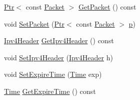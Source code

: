 \begin{DoxyCompactItemize}
\hyperlink{classns3_1_1Ptr}{Ptr}$<$ const \hyperlink{classns3_1_1Packet}{Packet} $>$ \hyperlink{classns3_1_1aodv_1_1QueueEntry_a2c36e5c3017c7fba3c695e08fd681497}{Get\+Packet} () const 
\item 
void \hyperlink{classns3_1_1aodv_1_1QueueEntry_a8fa8ea1be9c2eeb6edecc478ed0d5e32}{Set\+Packet} (\hyperlink{classns3_1_1Ptr}{Ptr}$<$ const \hyperlink{classns3_1_1Packet}{Packet} $>$ \hyperlink{lte__link__budget__x2__handover__measures_8m_ac9de518908a968428863f829398a4e62}{p})
\item 
\hyperlink{classns3_1_1Ipv4Header}{Ipv4\+Header} \hyperlink{classns3_1_1aodv_1_1QueueEntry_a0ec60aa6b1d7c7835bafc664da7efb12}{Get\+Ipv4\+Header} () const 
\item 
void \hyperlink{classns3_1_1aodv_1_1QueueEntry_afee33142d326a5d62388cb6bc47a1941}{Set\+Ipv4\+Header} (\hyperlink{classns3_1_1Ipv4Header}{Ipv4\+Header} h)
\item 
void \hyperlink{classns3_1_1aodv_1_1QueueEntry_aa1837744c201bb1c76532ac6b8c916e8}{Set\+Expire\+Time} (\hyperlink{classns3_1_1Time}{Time} exp)
\item 
\hyperlink{classns3_1_1Time}{Time} \hyperlink{classns3_1_1aodv_1_1QueueEntry_a4708195804d9c474a20e4e581a814622}{Get\+Expire\+Time} () const 
\end{DoxyCompactItemize}
